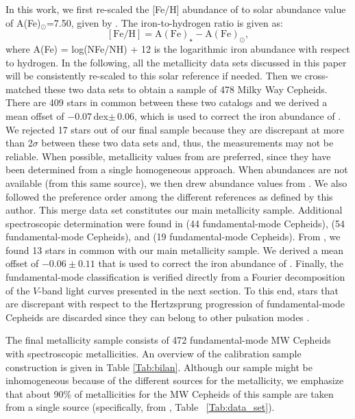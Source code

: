 \documentclass[article]{aa} %
\begin{document}
In this work, we first re-scaled the [Fe/H] abundance of \cite{Luck2018} to solar abundance value of A(Fe)$_\odot$=7.50, given by \cite{Asplund2009}. The iron-to-hydrogen ratio is given as:
\begin{equation}
    \mathrm{[Fe/H]}=\mathrm{A(Fe)_\star-A(Fe)_\odot}
,\end{equation}
where A(Fe) = log(NFe/NH) + 12 is the logarithmic iron abundance with respect to hydrogen.
In the following, all the metallicity data sets discussed in this paper will be consistently re-scaled to this solar reference if needed. Then we cross-matched these two data sets to obtain a sample of 478 Milky Way Cepheids. There are 409 stars in common between these two catalogs and we derived a mean offset of $-0.07\,$dex$\pm \,$0.06, which is used to correct the iron abundance of \cite{Groenewegen2018}. We rejected 17 stars out of our final sample because they are discrepant at more than 2$\sigma$ between these two data sets and, thus, the measurements may not be reliable. When possible, metallicity values from \cite{Luck2018} are preferred, since they have been determined from a single homogeneous approach. When abundances are not available (from this same source), we then drew abundance values from \cite{Groenewegen2018}. We also followed the preference order among the different references as defined by this author. This merge data set constitutes our main metallicity sample.  Additional spectroscopic determination were found in \cite{Trentin2023} (44 fundamental-mode Cepheids), \cite{Kovtyukh2022} (54 fundamental-mode Cepheids), and \cite{Ripepi2021} (19 fundamental-mode Cepheids). From \cite{Kovtyukh2022}, we found 13 stars in common with our main metallicity sample. We derived a mean offset of $-0.06\pm0.11$ that is used to correct the iron abundance of \cite{Kovtyukh2022}.
Finally, the fundamental-mode classification is verified directly from a Fourier decomposition of the $V$-band light curves presented in the next section. To this end, stars that are discrepant with respect to the Hertzsprung progression of fundamental-mode Cepheids are discarded since they can belong to other pulsation modes \citep{AntonelloPoretti1986,AntonelloPoretti1990}. 

The final metallicity sample consists of 472 fundamental-mode MW Cepheids with spectroscopic metallicities. An overview of the calibration sample construction is given in Table \ref{Tab:bilan}. Although our sample might be inhomogeneous because of the different sources for the metallicity, we emphasize that about 90\% of metallicities for the MW Cepheids of this sample are taken from a single source (specifically, from \cite{Luck2018}, Table~ \ref{Tab:data_set}).
\end{document}
